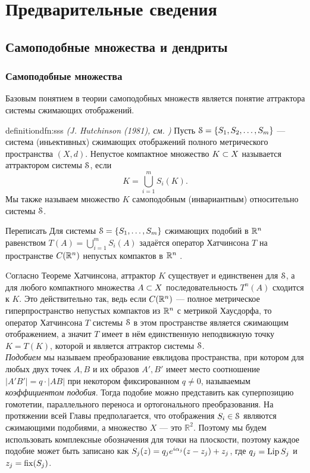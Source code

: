 \chapter{Предварительные сведения}

\section{Самоподобные множества и дендриты}

\subsection{Самоподобные множества}

Базовым понятием в теории самоподобных множеств является понятие аттрактора системы сжимающих отображений.

\begin{restatethis}{definition}{dfn:sss}%
{\em (J. Hutchinson (1981), см. {\cite{Hut1981}})} 
Пусть ${\EuScript S}=\{S_1, S_2, \ldots, S_m\}$ ---  система (иньективных) сжимающих отображений полного метрического пространства $(X, d)$.
Непустое компактное множество $K\subset X$ называется аттрактором системы ${\EuScript S}$, если 
$$K = \bigcup \limits_{i=1}^m S_i (K).$$
Мы также называем множество $K$ самоподобным (инвариантным) относительно системы ${\EuScript S}$.
\end{restatethis} 
\begin{definition} Переписать
Для системы ${\EuScript S}=\{S_1,\ldots,S_m\}$ сжимающих подобий в $\mathbb{R}^n$  равенством $T(A)=\bigcup\limits_{i=1}^m S_i(A)$ задаётся  оператор Хатчинсона $T$ на пространстве $C(\mathbb{R}^n)$ непустых компактов в $\mathbb{R}^n$ .
\end{definition}

Cогласно Теореме Хатчинсона, аттрактор $K$ существует и единственен для ${\EuScript S}$, а для любого компактного множества $A\subset X$ последовательность $T^n (A)$ сходится к $K$.
Это действительно так, ведь если $C(\mathbb{R}^n)$ --- полное метрическое гиперпространство непустых компактов из $\mathbb{R}^n$ с метрикой Хаусдорфа, то оператор Хатчинсона $T$ системы ${\EuScript S}$ в этом пространстве является сжимающим отображением, а значит $T$ имеет в нём единственную неподвижную точку $K=T(K)$, которой и является аттрактор системы ${\EuScript S}$.\\

{\em Подобием} мы называем преобразование евклидова пространства, при котором для любых двух точек $A, B$ и их образов $A',B'$ имеет место соотношение $|A'B'|=q\cdot |AB|$ при некотором фиксированном $q\neq 0$, называемым {\em коэффициентом подобия}.
Тогда подобие можно представить как суперпозицию гомотетии, параллельного переноса и ортогонального преобразования.
На протяжении всей Главы предполагается, что отображения $S_i\in {\EuScript S}$ являются сжимающими подобиями, а множество $X$ --- это $\mathbb{R}^2$.
Поэтому мы будем использовать комплексные обозначения для точки на плоскости, поэтому каждое подобие может быть записано как $S_j(z)=q_j e^{i\alpha_j}(z-z_j)+z_j$, где $q_j=\mathop{\rm Lip} \nolimits S_j$ и $z_j=\mathop{\rm fix} \nolimits(S_j)$.

